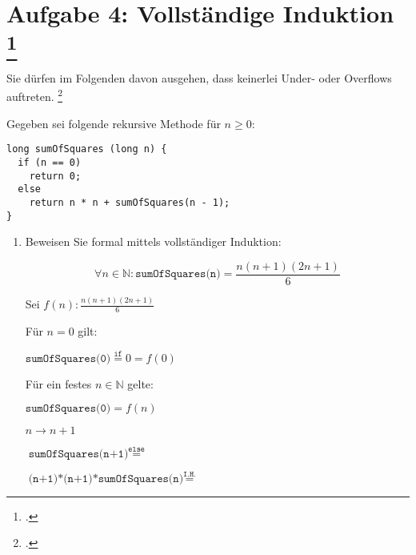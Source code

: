 \documentclass{lehramt-informatik-aufgabe}
\begin{document}
\section{Aufgabe 4: Vollständige Induktion
\footcite{sosy:ab:8}
}

Sie dürfen im Folgenden davon ausgehen, dass keinerlei Under- oder
Overflows auftreten.
\footcite[Thema 1 Aufgabe 4]{examen:66115:2017:03}

\noindent
Gegeben sei folgende rekursive Methode für $n \geq 0$:

\begin{verbatim}
long sumOfSquares (long n) {
  if (n == 0)
    return 0;
  else
    return n * n + sumOfSquares(n - 1);
}
\end{verbatim}

\begin{enumerate}


\item Beweisen Sie formal mittels vollständiger Induktion:

\begin{displaymath}
\forall n \in \mathbb{N} : \texttt{sumOfSquares(n)} =
\frac{n(n + 1)(2n + 1)}{6}
\end{displaymath}

\begin{antwort}
Sei $f(n): \frac{n(n + 1)(2n + 1)}{6}$

%


Für $n = 0$ gilt:

$\texttt{sumOfSquares(0)} \overset{\texttt{if}}{=} 0 = f(0)$

%


Für ein festes $n \in \mathbb{N}$ gelte:

$\texttt{sumOfSquares(0)} = f(n)$

%



$n \rightarrow n + 1$

$\texttt{sumOfSquares(n+1)} \overset{\texttt{else}}{=}$

$\texttt{(n+1)*(n+1)*sumOfSquares(n)} \overset{\texttt{I.H.}}{=}$


\end{antwort}
\end{enumerate}
\end{document}
